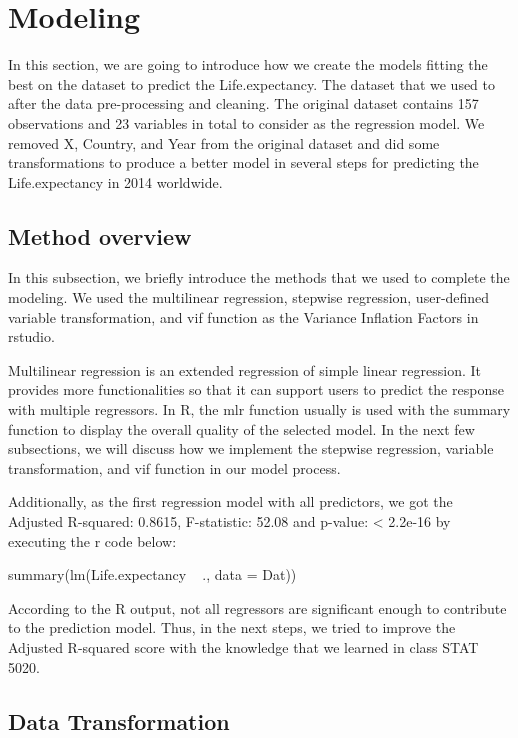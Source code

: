 \section{Modeling}
\label{sec:modeling}

In this section, we are going to introduce how we create the models fitting the best on the dataset to predict the Life.expectancy. The dataset that we used to after the data pre-processing and cleaning. The original dataset contains 157 observations and 23 variables in total to consider as the regression model. We removed X, Country, and Year from the original dataset and did some transformations to produce a better model in several steps for predicting the Life.expectancy in 2014 worldwide.

\subsection{Method overview}

In this subsection, we briefly introduce the methods that we used to complete the modeling. We used the multilinear regression, stepwise regression, user-defined variable transformation, and vif function as the Variance Inflation Factors in rstudio.

Multilinear regression is an extended regression of simple linear regression. It provides more functionalities so that it can support users to predict the response with multiple regressors. In R, the mlr function usually is used with the summary function to display the overall quality of the selected model. In the next few subsections, we will discuss how we implement the stepwise regression, variable transformation, and vif function in our model process.

Additionally, as the first regression model with all predictors, we got the Adjusted R-squared: 0.8615, F-statistic: 52.08 and p-value: < 2.2e-16 by executing the r code below:

summary(lm(Life.expectancy ~ ., data = Dat))

According to the R output, not all regressors are significant enough to contribute to the prediction model. Thus, in the next steps, we tried to improve the Adjusted R-squared score with the knowledge that we learned in class STAT 5020.

\subsection{Data Transformation}

